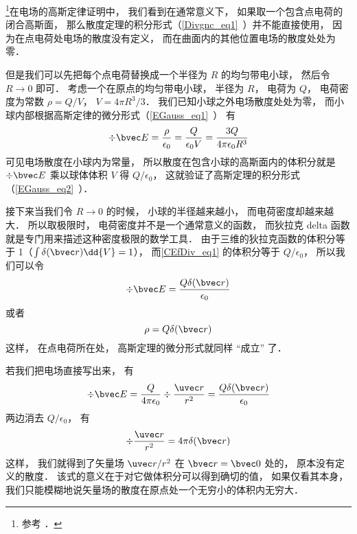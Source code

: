 
\begin{issues}
\issueDraft
\end{issues}


\footnote{参考 \cite{GriffE}．}在电场的高斯定律证明中， 我们看到在通常意义下， 如果取一个包含点电荷的闭合高斯面， 那么散度定理的积分形式（\autoref{Divgnc_eq1}~）并不能直接使用， 因为在点电荷处电场的散度没有定义， 而在曲面内的其他位置电场的散度处处为零．

但是我们可以先把每个点电荷替换成一个半径为 $R$ 的均匀带电小球， 然后令 $R\to 0$ 即可． 考虑一个在原点的均匀带电小球， 半径为 $R$， 电荷为 $Q$， 电荷密度为常数 $\rho = Q/V$， $V = 4\pi R^3/3$． 我们已知小球之外电场散度处处为零， 而小球内部根据高斯定律的微分形式（\autoref{EGauss_eq1}~） 有
\begin{equation}\label{CEfDiv_eq1}
\div \bvec E = \frac{\rho}{\epsilon_0} = \frac{Q}{\epsilon_0 V} = \frac{3Q}{4\pi \epsilon_0 R^3}
\end{equation}
可见电场散度在小球内为常量， 所以散度在包含小球的高斯面内的体积分就是 $\div \bvec E$ 乘以球体体积 $V$ 得 $Q/\epsilon_0$， 这就验证了高斯定理的积分形式（\autoref{EGauss_eq2}~）．

接下来当我们令 $R\to 0$ 的时候， 小球的半径越来越小， 而电荷密度却越来越大． 所以取极限时， 电荷密度并不是一个通常意义的函数， 而狄拉克 delta 函数就是专门用来描述这种密度极限的数学工具． 由于三维的狄拉克函数的体积分等于 1（$\int \delta(\bvec r)\dd{V} = 1$）， 而\autoref{CEfDiv_eq1} 的体积分等于 $Q/\epsilon_0$， 所以我们可以令
\begin{equation}
\div \bvec E = \frac{Q\delta(\bvec r)}{\epsilon_0}
\end{equation}
或者
\begin{equation}
\rho = Q\delta(\bvec r)
\end{equation}
这样， 在点电荷所在处， 高斯定理的微分形式就同样 “成立” 了．

若我们把电场直接写出来， 有
\begin{equation}
\div \bvec E = \frac{Q}{4\pi\epsilon_0}\div \frac{\uvec r}{r^2} = \frac{Q\delta(\bvec r)}{\epsilon_0}
\end{equation}
两边消去 $Q/\epsilon_0$， 有
\begin{equation}
\div \frac{\uvec r}{r^2} = 4\pi\delta(\bvec r)
\end{equation}
这样， 我们就得到了矢量场 ${\uvec r}/{r^2}$ 在 $\bvec r = \bvec 0$ 处的， 原本没有定义的散度． 该式的意义在于对它做体积分可以得到确切的值， 如果仅看其本身， 我们只能模糊地说矢量场的散度在原点处一个无穷小的体积内无穷大．
